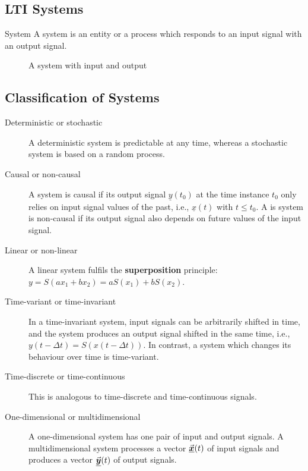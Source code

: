 \begin{refsection}
\section{\acs{LTI} Systems}

\begin{definition}{System}
	A system is an entity or a process which responds to an input signal with an output signal.
	
	\begin{figure}[H]
		\centering
		\caption{A system with input and output}
	\end{figure}
\end{definition}

\subsection{Classification of Systems}

\begin{description}
	\item[Deterministic or stochastic] A deterministic system is predictable at any time, whereas a stochastic system is based on a random process.
	\item[Causal or non-causal] A system is causal if its output signal $\underline{y}(t_0)$ at the time instance $t_0$ only relies on input signal values of the past, i.e., $\underline{x}(t)$ with $ t \leq t_0$. A is system is non-causal if its output signal also depends on future values of the input signal.
	\item[Linear or non-linear] A linear system fulfils the \textbf{superposition} principle: $y = S(a x_1 + b x_2) = a S(x_1) + b S(x_2)$.
	\item[Time-variant or time-invariant] In a time-invariant system, input signals can be arbitrarily shifted in time, and the system produces an output signal shifted in the same time, i.e., $y(t - \Delta t) = S(x(t - \Delta t))$. In contrast, a system which changes its behaviour over time is time-variant.
	\item[Time-discrete or time-continuous] This is analogous to time-discrete and time-continuous signals.
	\item[One-dimensional or multidimensional] A one-dimensional system has one pair of input and output signals. A multidimensional system processes a vector $\vec{\bm{\underline{x}}}(t)$ of input signals and produces a vector $\vec{\bm{\underline{y}}}(t)$ of output signals.
\end{description}


\end{refsection}
